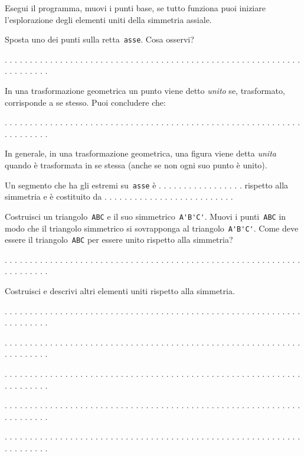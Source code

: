 Esegui il programma, muovi i punti base, se tutto funziona puoi iniziare
l'esplorazione degli elementi uniti della simmetria assiale.

Sposta uno dei punti sulla retta~\lstinline{asse}. Cosa osservi?

. . . . . . . . . . . . . . . . . . . . . . . . . . . . . . . . . . . . . . . .
. . . . . . . . . . . . . . . . . . . . . . . . . . . .

In una trasformazione geometrica un punto viene detto \emph{unito} se, 
trasformato, corrisponde a se stesso. Puoi concludere che:

. . . . . . . . . . . . . . . . . . . . . . . . . . . . . . . . . . . . . . . .
. . . . . . . . . . . . . . . . . . . . . . . . . . . .

In generale, in una trasformazione geometrica, una figura viene detta 
\emph{unita}
quando è trasformata in se stessa (anche se non ogni suo punto è unito).

Un segmento che ha gli estremi su~\lstinline{asse} 
è . . . . . . . . . . . . . . . . .
rispetto alla simmetria e è
costituito da . . . . . . . . . . . . . . . . . . . . . . . . . .

Costruisci un triangolo~\lstinline{ABC} e il suo simmetrico~\lstinline{A'B'C'}.
Muovi i punti~\lstinline{ABC} in modo che il triangolo simmetrico si 
sovrapponga 
al
triangolo~\lstinline{A'B'C'}.
Come deve essere il triangolo~\lstinline{ABC} per essere unito rispetto alla 
simmetria?

. . . . . . . . . . . . . . . . . . . . . . . . . . . . . . . . . . . . . . . .
. . . . . . . . . . . . . . . . . . . . . . . . . . . .

Costruisci e descrivi altri elementi uniti rispetto alla simmetria.

. . . . . . . . . . . . . . . . . . . . . . . . . . . . . . . . . . . . . . . .
. . . . . . . . . . . . . . . . . . . . . . . . . . . .

. . . . . . . . . . . . . . . . . . . . . . . . . . . . . . . . . . . . . . . .
. . . . . . . . . . . . . . . . . . . . . . . . . . . .

. . . . . . . . . . . . . . . . . . . . . . . . . . . . . . . . . . . . . . . .
. . . . . . . . . . . . . . . . . . . . . . . . . . . .

. . . . . . . . . . . . . . . . . . . . . . . . . . . . . . . . . . . . . . . .
. . . . . . . . . . . . . . . . . . . . . . . . . . . .

. . . . . . . . . . . . . . . . . . . . . . . . . . . . . . . . . . . . . . . .
. . . . . . . . . . . . . . . . . . . . . . . . . . . .

